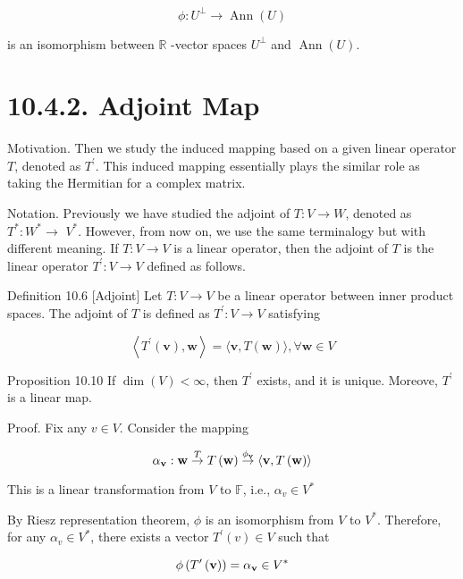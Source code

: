\documentclass[11pt]{article}
\begin{document}
\[
\phi  : {U}^{ \bot  } \rightarrow  \operatorname{Ann}\left( U\right)
\]

is an isomorphism between \(\mathbb{R}\) -vector spaces \({U}^{ \bot  }\) and \(\operatorname{Ann}\left( U\right)\).

\section*{10.4.2. Adjoint Map}

Motivation. Then we study the induced mapping based on a given linear operator \(T\), denoted as \({T}^{\prime }\). This induced mapping essentially plays the similar role as taking the Hermitian for a complex matrix.

Notation. Previously we have studied the adjoint of \(T : V \rightarrow  W\), denoted as \({T}^{ * } : {W}^{ * } \rightarrow\)  \({V}^{ * }\). However, from now on, we use the same terminalogy but with different meaning. If \(T : V \rightarrow  V\) is a linear operator, then the adjoint of \(T\) is the linear operator \({T}^{\prime } : V \rightarrow  V\) defined as follows.

Definition 10.6 [Adjoint] Let \(T : V \rightarrow  V\) be a linear operator between inner product spaces. The adjoint of \(T\) is defined as \({T}^{\prime } : V \rightarrow  V\) satisfying

\[
\left\langle  {{T}^{\prime }\left( \mathbf{v}\right) ,\mathbf{w}}\right\rangle   = \langle \mathbf{v},T\left( \mathbf{w}\right) \rangle ,\forall \mathbf{w} \in  V \tag{10.1}
\]

Proposition 10.10 If \(\dim \left( V\right)  < \infty\), then \({T}^{\prime }\) exists, and it is unique. Moreove, \({T}^{\prime }\) is a linear map.

Proof. Fix any \(v \in  V\). Consider the mapping

\[
\alpha_{\bf v} : \mathbf{w}\overset{T}{ \rightarrow  }T\left( \mathbf{w}\right) \overset{{\phi }_{\bf v}}{ \rightarrow  }\langle \mathbf{v},T\left( \mathbf{w}\right) \rangle
\]

This is a linear transformation from \(V\) to \(\mathbb{F}\), i.e., \(\alpha_{v} \in  {V}^{ * }\)

By Riesz representation theorem, \(\phi\) is an isomorphism from \(V\) to \({V}^{ * }\). Therefore, for any \(\alpha_{v} \in  {V}^{ * }\), there exists a vector \({T}^{\prime }\left( v\right)  \in  V\) such that

\[
\phi \left( {{T}^{\prime }\left( \mathbf{v}\right) }\right)  = \alpha_{\bf v} \in  {V}^{ * }
\]
\end{document}
